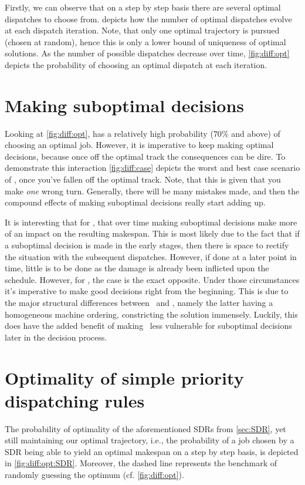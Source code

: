 Firstly, we can observe that on a step by step basis there are several optimal dispatches to choose from.  depicts how the number of optimal dispatches evolve at each dispatch iteration. Note, that only one optimal trajectory is pursued (chosen at random), hence this is only a lower bound of uniqueness of optimal solutions.
As the number of possible dispatches decrease over time, \cref{fig:diff:opt} depicts the probability of choosing an optimal dispatch at each iteration. 

\section{Making suboptimal decisions}\label{sec:diff:opt:sub}
Looking at \cref{fig:diff:opt},  has a relatively high probability ($70\%$ and above) of choosing an optimal job. However, it is imperative to keep making optimal decisions, because once off the optimal track the consequences can be dire. To demonstrate this interaction \cref{fig:diff:case} depicts the worst and best case scenario of \namerho, once you've fallen off the optimal track. Note, that this is given that you make \emph{one} wrong turn. Generally, there will be many mistakes made, and then the compound effects of making suboptimal decisions really start adding up. 

It is interesting that for \JSP, that over time making suboptimal decisions make more of an impact on the resulting makespan. This is most likely due to the fact that if a suboptimal decision is made in the early stages, then there is space to rectify the situation with the subsequent dispatches. However, if done at a later point in time, little is to be done as the damage is already been inflicted upon the schedule. 
However, for \FSP, the case is the exact opposite. Under those circumstances it's imperative to make good decisions right from the beginning. This is due to the major structural differences between \jsp\ and \fsp, namely the latter having a homogeneous machine ordering, constricting the solution immensely. Luckily, this does have the added benefit of making \fsp\ less vulnerable for suboptimal decisions later in the decision process. 


\section{Optimality of simple priority dispatching rules}\label{sec:diff:opt:sdr}
The probability of optimality of the aforementioned SDRs from \cref{sec:SDR}, yet still maintaining our optimal trajectory, i.e., the probability of a job chosen by a SDR being able to yield an optimal makespan on a step by step basis, is depicted  in   \cref{fig:diff:opt:SDR}. Moreover, the dashed line represents the benchmark of randomly guessing the optimum (cf. \cref{fig:diff:opt}).

